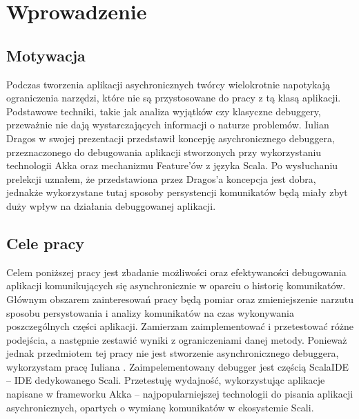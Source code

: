 \chapter{Wprowadzenie}


\section{Motywacja}

Podczas tworzenia aplikacji asychronicznych twórcy wielokrotnie napotykają ograniczenia narzędzi, które nie są przystosowane do pracy z tą klasą aplikacji. Podstawowe techniki, takie jak analiza wyjątków czy klasyczne debuggery, przeważnie nie dają wystarczających informacji o naturze problemów. Iulian Dragos w swojej prezentacji \cite{rethingningDebugger} przedstawił koncepję asychronicznego debuggera, przeznaczonego do debugowania aplikacji stworzonych przy wykorzystaniu technologii Akka oraz mechanizmu Feature'ów z języka Scala. Po wysłuchaniu prelekcji uznałem, że przedstawiona przez Dragos'a koncepcja jest dobra, jednakże wykorzystane tutaj sposoby persystencji komunikatów będą miały zbyt duży wpływ na działania debuggowanej aplikacji.



\section{Cele pracy}


Celem poniższej pracy jest zbadanie możliwości oraz efektywaności debugowania aplikacji komunikujących się asynchronicznie w oparciu o historię komunikatów. Głównym obszarem zainteresowań pracy będą pomiar oraz zmieniejszenie narzutu sposobu persystowania i analizy komunikatów na czas wykonywania poszczególnych części aplikacji. Zamierzam zaimplementować i przetestować różne podejścia, a następnie zestawić wyniki z ograniczeniami danej metody. Ponieważ jednak przedmiotem tej pracy nie jest stworzenie asynchronicznego debuggera, wykorzystam pracę Iuliana \cite{asychDebuggerGh}. Zaimpelementowany debugger jest częścią ScalaIDE – IDE dedykowanego Scali. Przetestuję wydajność, wykorzystując aplikacje napisane w frameworku Akka – najpopularniejszej technologii do pisania aplikacji asychronicznych, opartych o wymianę komunikatów w ekosystemie Scali.